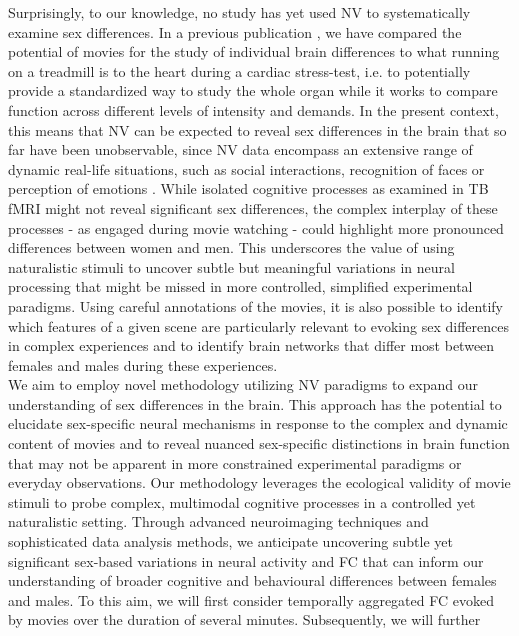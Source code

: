 \documentclass[11pt,a4paper]{article}
\begin{document}
Surprisingly, to our knowledge, no study has yet used NV to systematically examine sex differences. 
In a previous publication \parencite{eickhoffClinicalApplicationsMovie2020a}, we have compared the potential of movies for the study of 
individual brain differences to what running on a treadmill is to the heart during a cardiac stress-test, 
i.e. to potentially provide a standardized way to study the whole organ while it works to compare function 
across different levels of intensity and demands. In the present context, this means that NV can be expected 
to reveal sex differences in the brain that so far have been unobservable, since NV data encompass an extensive 
range of dynamic real-life situations, such as social interactions, recognition of faces or perception of 
emotions \parencite{sonkusareNaturalisticStimuliNeuroscience2019}. While isolated cognitive processes as examined in TB fMRI might not reveal 
significant sex differences, the complex interplay of these processes - as engaged during movie watching - could 
highlight more pronounced differences between women and men. This underscores the value of using naturalistic stimuli 
to uncover subtle but meaningful variations in neural processing that might be missed in more controlled, simplified 
experimental paradigms. Using careful annotations of the movies, it is also possible to identify which features 
of a given scene are particularly relevant to evoking sex differences in complex experiences and to identify 
brain networks that differ most between females and males during these experiences.\\
We aim to employ novel methodology utilizing NV paradigms to expand our understanding of sex differences in the 
brain. This approach has the potential to elucidate sex-specific neural mechanisms in response to the complex and 
dynamic content of movies and to reveal nuanced sex-specific distinctions in brain function that may not be apparent 
in more constrained experimental paradigms or everyday observations. Our methodology leverages the ecological 
validity of movie stimuli to probe complex, multimodal cognitive processes in a controlled yet naturalistic setting. 
Through advanced neuroimaging techniques and sophisticated data analysis methods, we anticipate uncovering 
subtle yet significant sex-based variations in neural activity and FC that can inform our understanding of 
broader cognitive and behavioural differences between females and males. To this aim, we will first consider 
temporally aggregated FC evoked by movies over the duration of several minutes. Subsequently, we will further 
\end{document}
